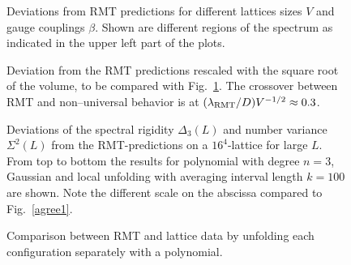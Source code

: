 \begin{figure}
\begin{minipage}{7.5cm}
  \centerline{}
\end{minipage}
\hfill
\begin{minipage}{7.5cm}
\centerline{}
\end{minipage}

\begin{minipage}{7.5cm}
\centerline{}
\end{minipage}
\hfill
\begin{minipage}{7.5cm}
\centerline{}
\end{minipage}
\caption{Deviations from RMT predictions for different lattices
         sizes $V$ and gauge couplings $\beta$. Shown are different
         regions of the spectrum as indicated in the upper left
         part of the plots.
\label{enssig}}
\end{figure}

\begin{figure}
\caption{
  Deviation from the RMT predictions rescaled with the square root of
  the volume, to be compared with Fig.~\protect\ref{enssig}. The
  crossover between RMT and non--universal behavior is at
  $(\lambda_{\rm RMT}/D)V^{-1/2}\approx0.3$.
  \label{ensscl}}
\end{figure}

\begin{figure}
\begin{minipage}{7.5cm}
\end{minipage}
\hfill
\begin{minipage}{7.5cm}
\end{minipage}
\caption{Deviations of the spectral rigidity $\Delta_3(L)$ and number
  variance $\Sigma^2(L)$ from the RMT-predictions on a $16^4$-lattice
  for large $L$. From top to bottom the results for polynomial with
  degree $n=3$, Gaussian and local unfolding with averaging interval
  length $k=100$ are shown. Note the different scale on the abscissa
  compared to Fig.~\protect\ref{agree1}.
\label{deviate1}}
\end{figure}

\begin{figure}
\caption{Comparison between RMT and lattice data by unfolding each
  configuration separately with a polynomial.
\label{consig}}
\end{figure}

